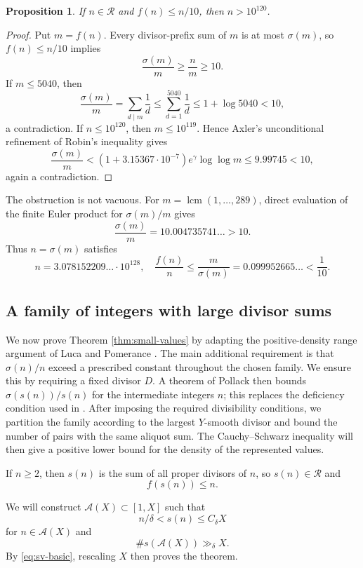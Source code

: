 \documentclass[11pt,letterpaper,reqno]{amsart}
\numberwithin{equation}{section}
\newtheorem{proposition}[theorem]{Proposition}
\theoremstyle{remark}
\newcommand{\Rcal}{\mathcal{R}}
\DeclareMathOperator{\lcm}{lcm}
\renewcommand{\leq}{\leqslant}
\renewcommand{\geq}{\geqslant}
\begin{document}
\begin{proposition}
If $n\in\Rcal$ and $f(n)\leq n/10$, then $n>10^{120}$.
\end{proposition}

\begin{proof}
Put $m=f(n)$. Every divisor-prefix sum of $m$ is at most $\sigma(m)$,
so $f(n)\leq n/10$ implies
\[
 \frac{\sigma(m)}m\geq\frac nm\geq10.
\]
If $m\leq5040$, then
\[
 \frac{\sigma(m)}m=\sum_{d\mid m}\frac1d
 \leq\sum_{d=1}^{5040}\frac1d
 \leq1+\log5040<10,
\]
a contradiction. If $n\leq10^{120}$, then $m\leq10^{119}$. Hence
Axler's unconditional refinement of Robin's inequality
\cite[Corollary~2]{AxlerRobin} gives
\[
 \frac{\sigma(m)}m
 <(1+3.15367\cdot10^{-7})e^\gamma\log\log m
 \leq9.99745<10,
\]
again a contradiction.
\end{proof}

The obstruction is not vacuous. For
$m=\lcm(1,\ldots,289)$, direct evaluation of the finite Euler product for
$\sigma(m)/m$ gives
\[
 \frac{\sigma(m)}m=10.004735741\ldots>10.
\]
Thus $n=\sigma(m)$ satisfies
\[
 n=3.078152209\ldots\cdot10^{128},
 \quad
 \frac{f(n)}n\leq\frac m{\sigma(m)}
 =0.099952665\ldots<\frac1{10}.
\]


\subsection{A family of integers with large divisor sums}

We now prove Theorem \ref{thm:small-values} by adapting the positive-density
range argument of Luca and Pomerance \cite{LucaPomerance}. The main
additional requirement is that $\sigma(n)/n$ exceed a prescribed constant
throughout the chosen family. We ensure this by requiring a fixed divisor $D$.
A theorem of Pollack \cite{Pollack} then bounds $\sigma(s(n))/s(n)$
for the intermediate integers $n$; this replaces the deficiency condition
used in \cite{LucaPomerance}. After imposing the required divisibility
conditions, we partition the family according to the largest $Y$-smooth
divisor and bound the number of pairs with the same aliquot sum.
The Cauchy--Schwarz inequality will then give a positive lower bound for the density
of the represented values.

If $n\geq2$, then $s(n)$ is the sum of all proper divisors of $n$, so
$s(n)\in\Rcal$ and
\begin{equation}\label{eq:sv-basic}
 f(s(n))\leq n .
\end{equation}


We will construct $\mathcal{A}(X)\subset[1,X]$ such that
\[
 n/\delta<s(n)\leq C_\delta X
\]
for $n\in\mathcal{A}(X)$ and
\[ \#s(\mathcal{A}(X))\gg_\delta X. \]
By \eqref{eq:sv-basic}, rescaling $X$ then proves the theorem.
\end{document}
